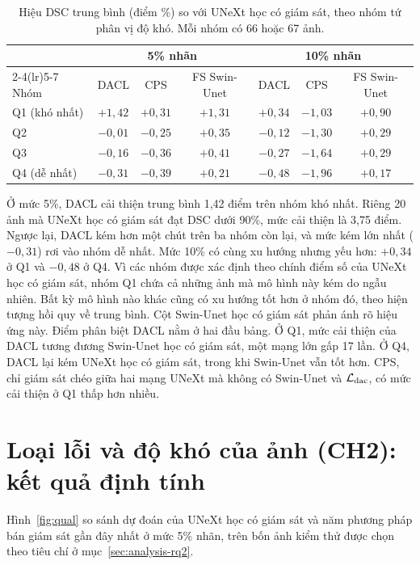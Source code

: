 \begin{table}[ht]
\centering
\caption{Hiệu DSC trung bình (điểm \%) so với UNeXt học có giám sát, theo nhóm tứ phân vị độ khó. Mỗi nhóm có 66 hoặc 67 ảnh.}
\label{tab:quartile}
\small
\begin{tabular}{lccc ccc}
\toprule
 & \multicolumn{3}{c}{5\% nhãn} & \multicolumn{3}{c}{10\% nhãn} \\
\cmidrule(lr){2-4}\cmidrule(lr){5-7}
Nhóm & DACL & CPS & FS Swin-Unet & DACL & CPS & FS Swin-Unet \\
\midrule
Q1 (khó nhất) & $+1{,}42$ & $+0{,}31$ & $+1{,}31$ & $+0{,}34$ & $-1{,}03$ & $+0{,}90$ \\
Q2            & $-0{,}01$ & $-0{,}25$ & $+0{,}35$ & $-0{,}12$ & $-1{,}30$ & $+0{,}29$ \\
Q3            & $-0{,}16$ & $-0{,}36$ & $+0{,}41$ & $-0{,}27$ & $-1{,}64$ & $+0{,}29$ \\
Q4 (dễ nhất)  & $-0{,}31$ & $-0{,}39$ & $+0{,}21$ & $-0{,}48$ & $-1{,}96$ & $+0{,}17$ \\
\bottomrule
\end{tabular}
\end{table}

Ở mức 5\%, DACL cải thiện trung bình 1,42 điểm trên nhóm khó nhất. Riêng 20 ảnh mà UNeXt học có giám sát đạt DSC dưới 90\%, mức cải thiện là 3,75 điểm. Ngược lại, DACL kém hơn một chút trên ba nhóm còn lại, và mức kém lớn nhất ($-0{,}31$) rơi vào nhóm dễ nhất. Mức 10\% có cùng xu hướng nhưng yếu hơn: $+0{,}34$ ở Q1 và $-0{,}48$ ở Q4. Vì các nhóm được xác định theo chính điểm số của UNeXt học có giám sát, nhóm Q1 chứa cả những ảnh mà mô hình này kém do ngẫu nhiên. Bất kỳ mô hình nào khác cũng có xu hướng tốt hơn ở nhóm đó, theo hiện tượng hồi quy về trung bình. Cột Swin-Unet học có giám sát phản ánh rõ hiệu ứng này. Điểm phân biệt DACL nằm ở hai đầu bảng. Ở Q1, mức cải thiện của DACL tương đương Swin-Unet học có giám sát, một mạng lớn gấp 17 lần. Ở Q4, DACL lại kém UNeXt học có giám sát, trong khi Swin-Unet vẫn tốt hơn. CPS, chỉ giám sát chéo giữa hai mạng UNeXt mà không có Swin-Unet và $\mathcal{L}_{\mathrm{dac}}$, có mức cải thiện ở Q1 thấp hơn nhiều.

\section{Loại lỗi và độ khó của ảnh (CH2): kết quả định tính}
\label{sec:res-qual}

Hình~\ref{fig:qual} so sánh dự đoán của UNeXt học có giám sát và năm phương pháp bán giám sát gần đây nhất ở mức 5\% nhãn, trên bốn ảnh kiểm thử được chọn theo tiêu chí ở mục~\ref{sec:analysis-rq2}.


